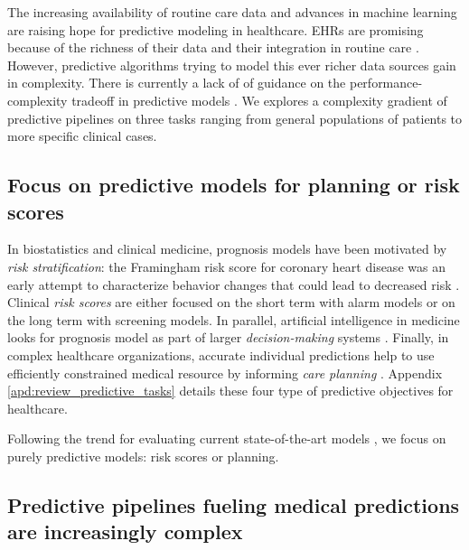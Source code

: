 \documentclass[french,12pt,twoside,a4paper]{book}
\begin{document}
The increasing availability of routine care data and advances in machine
learning are raising hope for predictive modeling in healthcare. EHRs are
promising because of the richness of their data and their integration in routine
care \citep{raghupathi2014big}. However, predictive algorithms trying to model
this ever richer data sources gain in complexity. There is currently a lack of
of guidance on the performance-complexity tradeoff in predictive models
\citep{de2022guidelines}. We explores a complexity gradient of predictive
pipelines on three tasks ranging from general populations of patients to more
specific clinical cases.

\subsection{Focus on predictive models for planning or risk scores}%

In biostatistics and clinical medicine, prognosis models have been motivated by
\emph{risk stratification}: the Framingham risk score for coronary heart disease
was an early attempt to characterize behavior changes that could lead to
decreased risk \citep{brand1976multivariate}. Clinical \emph{risk scores} are
either focused on the short term with alarm models
\citep{tang2007global,rothman2013development,wong2021external} or on the long
term with screening models. In parallel, artificial intelligence in medicine
looks for prognosis model as part of larger \emph{decision-making} systems
\citep{Szolovits1982artificial}. Finally, in complex healthcare organizations, accurate
individual predictions help to use efficiently constrained medical resource by
informing \emph{care planning} \citep{topol2019high}. Appendix
\ref{apd:review_predictive_tasks} details these four type of predictive objectives for
healthcare.

Following the trend for evaluating current state-of-the-art models
\citep{wornow2023shaky}, we focus on purely predictive models: risk scores or
planning.

\subsection{Predictive pipelines fueling medical predictions are increasingly
  complex}%
\label{subsec:predictive_models:complex_data}%
\end{document}
